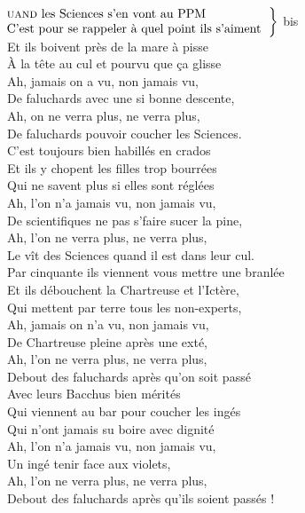 
\\ 
$\left.\begin{tabular}{l}
\hspace{-0.4cm}
\textsc{uand} les Sciences s'en vont au PPM   
\\
\hspace{-0.4cm}
C'est pour se rappeler à quel point ils s'aiment         
\end{tabular}\right\rbrace$ bis
\\Et ils boivent près de la mare à pisse	
\\À la tête au cul et pourvu que ça glisse	
\\Ah, jamais on a vu, non jamais vu,	
\\De faluchards avec une si bonne descente,	
\\Ah, on ne verra plus, ne verra plus,	
\\De faluchards pouvoir coucher les Sciences.	
\\
{C'est toujours bien habillés en crados    ~~}
\\Et ils y chopent les filles trop bourrées	
\\Qui ne savent plus si elles sont réglées	
\\Ah, l'on n'a jamais vu, non jamais vu,
\\De scientifiques ne pas s'faire sucer la pine,	
\\Ah, l'on ne verra plus, ne verra plus,	
\\Le vît des Sciences quand il est dans leur cul.
\\
{Par cinquante ils viennent vous mettre une branlée}
\\Et ils débouchent la Chartreuse et l'Ictère,	
\\Qui mettent par terre tous les non-experts,	
\\Ah, jamais on n'a vu, non jamais vu,	
\\De Chartreuse pleine après une exté,	
\\Ah, l'on ne verra plus, ne verra plus,	
\\Debout des faluchards après qu'on soit passé
\\
{Avec leurs Bacchus bien mérités}
\\Qui viennent au bar pour coucher les ingés	
\\Qui n'ont jamais su boire avec dignité	
\\Ah, l'on n'a jamais vu, non jamais vu,	
\\Un ingé tenir face aux violets,	
\\Ah, l'on ne verra plus, ne verra plus,	
\\Debout des faluchards après qu'ils soient passés !

\breakpage